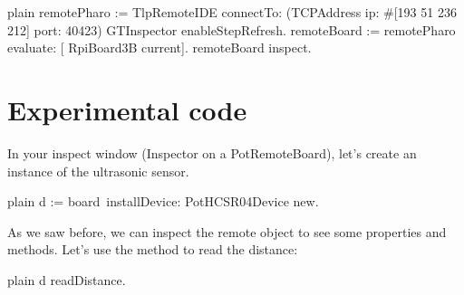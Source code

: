 \documentclass[10pt,twoside,english]{_support/latex/sbabook/sbabook}
\begin{document}
\begin{displaycode}{plain}
remotePharo := TlpRemoteIDE connectTo: (TCPAddress ip: #[193 51 236 212] port: 40423)
GTInspector enableStepRefresh.
remoteBoard := remotePharo evaluate: [ RpiBoard3B current].
remoteBoard inspect.
\end{displaycode}
\section{Experimental code}
In your inspect window (Inspector on a PotRemoteBoard), let’s create an instance of the ultrasonic sensor. 

\begin{displaycode}{plain}
d := board installDevice: PotHCSR04Device new. ​ 
\end{displaycode}

As we saw before, we can inspect the remote object to see some properties and methods. Let's use the method  to read the distance: 

\begin{displaycode}{plain}
d readDistance.  
\end{displaycode}


\backmatter

\end{document}
